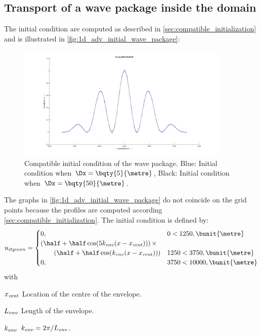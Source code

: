 \subsection{Transport of a wave package inside the domain}
The initial condition are computed as described in \autoref{sec:compatible_initialization}
and is illustrated in \autoref{fig:1d_adv_initial_wave_package}:
\begin{figure}[H]
    \centering
    \includegraphics[width=0.9\textwidth]{figures/wave_package_000s.png}
    \caption{Compatible initial condition of the wave package. Blue: Initial condition when  $\Dx=\bqty{5}{\metre}$, Black: Initial condition when  $\Dx=\bqty{50}{\metre}$.}
    \label{fig:1d_adv_initial_wave_package}
\end{figure}
The graphs in \autoref{fig:1d_adv_initial_wave_package} do not coincide on the grid points because the profiles are computed according \autoref{sec:compatible_initialization}.
The initial condition is defined by:
\begin{align}
    u_{it given} =
    \begin{cases}
        0, & 0 < 1250, \bunit{\metre} \\
        \left(\half + \half \cos( 5k_{\it env}(x - x_{\it cent})) \right) \times \\
        \qquad\left(\half + \half \cos( k_{\it env} (x - x_{\it cent})) \right)
        & 1250 < 3750,  \bunit{\metre}
        \\
        0,  & 3750 < 10000,  \bunit{\metre}
    \end{cases}
\end{align}
with
\begin{symbollist}
    \item[$x_{\it cent}$] Location of the centre of the envelope.
    \item[$L_{\it env}$] Length of the envelope.
    \item[$k_{\it env}$] $k_{\it env} = 2\pi / L_{\it env}$.
\end{symbollist}

